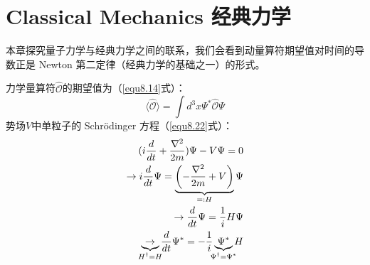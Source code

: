 






\chapter[经典力学]{Classical Mechanics \quad 经典力学}
\label{chap10}
本章探究量子力学与经典力学之间的联系，我们会看到动量算符期望值对时间的导数正是 Newton 第二定律（经典力学的基础之一）的形式。

力学量算符$\hat{\mathcal{O}}$的期望值为（\eqref{equ8.14}式）：
\[
    \langle \hat{\mathcal{O}} \rangle = \int d^3 x \Psi^* \hat{\mathcal{O}} \Psi
\]
势场$V$中单粒子的 Schr\"{o}dinger 方程（\eqref{equ8.22}式）：
\[
\begin{split}
    (i \frac{d}{dt} + \frac{\nabla^2}{2m}) \Psi - V \Psi = 0 \\
    \to i \frac{d}{dt} \Psi = \underbrace{ \left( -\frac{\nabla^2}{2m} + V \right) }_{=: H} \Psi \\
    \to \frac{d}{dt} \Psi = \frac{1}{i} H \Psi \\
    \underbrace{ \to }_{\mathclap{H^\dag = H}} \frac{d}{dt} \Psi^* = - \frac{1}{i} \underbrace{\Psi^*}_{\mathclap{\Psi^\dag = \Psi^*}} H
\end{split}
\]


